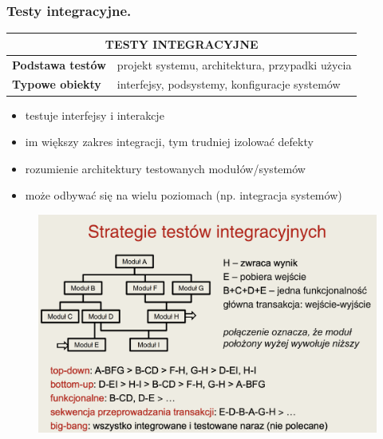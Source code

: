 \documentclass[12pt]{article}
\begin{document}
    \subsubsection{Testy integracyjne.}

    \begin{table}[H]
        \begin{center}
            \begin{tabular}{| p{4cm}| p{12cm}|}
                \hline
                \multicolumn{2}{|c|}{ \textbf{TESTY INTEGRACYJNE}}\\
                \hline
                \textbf{Podstawa testów} & projekt systemu, architektura, przypadki użycia\\
                \hline
                \textbf{Typowe obiekty} & interfejsy, podsystemy, konfiguracje systemów\\
                \hline
            \end{tabular}
        \end{center}
    \end{table}

    \begin{itemize}
        \item testuje interfejsy i interakcje
        \item im większy zakres integracji, tym trudniej izolować defekty
        \item rozumienie architektury testowanych modułów/systemów
        \item może odbywać się na wielu poziomach (np. integracja systemów)
    \end{itemize}

    \begin{figure}[H]
        \includegraphics[width=\linewidth]{strat_integr.png}
    \end{figure}
\end{document}
